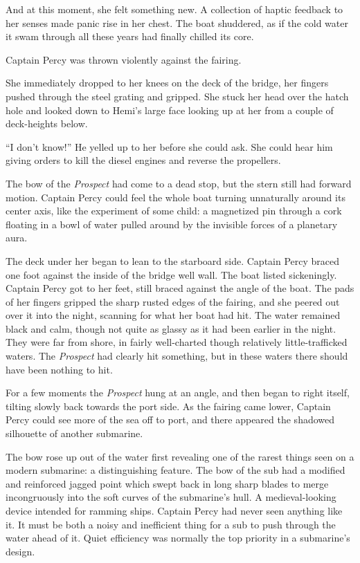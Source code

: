 \documentclass[]{article}
\begin{document}
And at this moment, she felt something new. A collection of haptic
feedback to her senses made panic rise in her chest. The boat shuddered,
as if the cold water it swam through all these years had finally chilled
its core.

Captain Percy was thrown violently against the fairing.

She immediately dropped to her knees on the deck of the bridge, her
fingers pushed through the steel grating and gripped. She stuck her head
over the hatch hole and looked down to Hemi's large face looking up at
her from a couple of deck-heights below.

``I don't know!'' He yelled up to her before she could ask. She could
hear him giving orders to kill the diesel engines and reverse the
propellers.

The bow of the \emph{Prospect} had come to a dead stop, but the stern
still had forward motion. Captain Percy could feel the whole boat
turning unnaturally around its center axis, like the experiment of some
child: a magnetized pin through a cork floating in a bowl of water
pulled around by the invisible forces of a planetary aura.

The deck under her began to lean to the starboard side. Captain Percy
braced one foot against the inside of the bridge well wall. The boat
listed sickeningly. Captain Percy got to her feet, still braced against
the angle of the boat. The pads of her fingers gripped the sharp rusted
edges of the fairing, and she peered out over it into the night,
scanning for what her boat had hit. The water remained black and calm,
though not quite as glassy as it had been earlier in the night. They
were far from shore, in fairly well-charted though relatively
little-trafficked waters. The \emph{Prospect} had clearly hit something,
but in these waters there should have been nothing to hit.

For a few moments the \emph{Prospect} hung at an angle, and then began
to right itself, tilting slowly back towards the port side. As the
fairing came lower, Captain Percy could see more of the sea off to port,
and there appeared the shadowed silhouette of another submarine.

The bow rose up out of the water first revealing one of the rarest
things seen on a modern submarine: a distinguishing feature. The bow of
the sub had a modified and reinforced jagged point which swept back in
long sharp blades to merge incongruously into the soft curves of the
submarine's hull. A medieval-looking device intended for ramming ships.
Captain Percy had never seen anything like it. It must be both a noisy
and inefficient thing for a sub to push through the water ahead of it.
Quiet efficiency was normally the top priority in a submarine's design.
\end{document}
